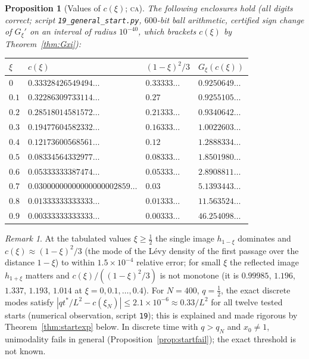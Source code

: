 \documentclass[11pt,a4paper]{article}
\newtheorem{proposition}[theorem]{Proposition}
\theoremstyle{definition}
\theoremstyle{remark}
\newtheorem{remark}[theorem]{Remark}
\newcommand{\CA}{\textsc{ca}}
\begin{document}
\begin{proposition}[Values of $c(\xi)$; \CA]\label{prop:cxi}
The following enclosures hold (all digits correct; script \texttt{19\_general\_start.py}, $600$-bit ball
arithmetic, certified sign change of $G_\xi'$ on an interval of radius $10^{-40}$, which brackets $c(\xi)$ by
Theorem~\ref{thm:Gxi}):
\begin{center}\small
\begin{tabular}{llll}
\toprule
$\xi$ & $c(\xi)$ & $(1-\xi)^2/3$ & $G_\xi(c(\xi))$\\
\midrule
$0$ & $0.33328426549494\ldots$ & $0.33333\ldots$ & $0.9250649\ldots$\\
$0.1$ & $0.32286309733114\ldots$ & $0.27$ & $0.9255105\ldots$\\
$0.2$ & $0.28518014581572\ldots$ & $0.21333\ldots$ & $0.9340642\ldots$\\
$0.3$ & $0.19477604582332\ldots$ & $0.16333\ldots$ & $1.0022603\ldots$\\
$0.4$ & $0.12173600568561\ldots$ & $0.12$ & $1.2888334\ldots$\\
$0.5$ & $0.08334564332977\ldots$ & $0.08333\ldots$ & $1.8501980\ldots$\\
$0.6$ & $0.05333333387474\ldots$ & $0.05333\ldots$ & $2.8908811\ldots$\\
$0.7$ & $0.03000000000000000002859\ldots$ & $0.03$ & $5.1393443\ldots$\\
$0.8$ & $0.01333333333333\ldots$ & $0.01333\ldots$ & $11.563524\ldots$\\
$0.9$ & $0.00333333333333\ldots$ & $0.00333\ldots$ & $46.254098\ldots$\\
\bottomrule
\end{tabular}
\end{center}
\end{proposition}

\begin{remark}
At the tabulated values $\xi\ge\frac12$ the single image $h_{1-\xi}$ dominates and $c(\xi)\approx(1-\xi)^2/3$ (the mode
of the L\'evy density of the first passage over the distance $1-\xi$) to within $1.5\times10^{-4}$ relative error; for small
$\xi$ the reflected image $h_{1+\xi}$ matters and $c(\xi)/((1-\xi)^2/3)$ is not monotone (it is $0.99985$, $1.196$,
$1.337$, $1.193$, $1.014$ at $\xi=0,0.1,\dots,0.4$). For $N=400$, $q=\frac12$, the exact discrete modes satisfy
$|qt^*/L^2-c(\xi_N)|\le2.1\times10^{-6}\approx0.33/L^2$ for all twelve tested starts (numerical observation,
script \texttt{19}); this is explained and made rigorous by Theorem~\ref{thm:startexp} below. %
In discrete time with $q>q_N$ and $x_0\ne1$, unimodality fails in general (Proposition~\ref{prop:startfail}); the exact
threshold is not known.
\end{remark}
\end{document}
